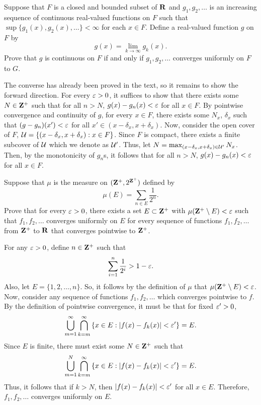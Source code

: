 \documentclass[11pt,oneside]{book}
\begin{document}
\begin{exercise}
    Suppose that $F$ is a closed and bounded subset of $\mathbf{R}$ and $g_1,g_2,\ldots$ is an increasing sequence of continuous real-valued functions on $F$ such that $\sup\{g_1(x), g_2(x),\ldots\} < \infty$ for each $x \in F$. Define a real-valued function $g$ on $F$ by \[
        g(x) = \lim_{k\to\infty} g_k(x).
    \]
    Prove that $g$ is continuous on $F$ if and only if $g_1,g_2,\ldots$ converges uniformly on $F$ to $G$.
\end{exercise}
\begin{solution}
    The converse has already been proved in the text, so it remains to
    show the forward direction. For every $\varepsilon > 0$, it suffices to show that
    there exists some $N \in \mathbf{Z}^+$ such that for all $n > N$, $g(x) - g_n(x) <
    \varepsilon$ for all $x \in F$. By pointwise convergence and continuity of $g$, 
    for every $x\in F$, there exists
    some $N_x$, $\delta_x$ such that $(g - g_n)(x') < \varepsilon$ for all $x' \in (x-\delta_x, x+\delta_x)$.
    Now, consider the open cover of $F$, $\mathcal{U} = \{(x-\delta_x, x+\delta_x): x\in F\}$. Since $F$ is 
    compact, there exists a finite subcover of $\mathcal{U}$ which we denote as $\mathcal{U}'$. 
    Thus, let $N = \max_{(x-\delta_x, x+\delta_x) \in \mathcal{U}'} N_x$. Then, by the monotonicity of $g_n$s,
    it follows that for all $n > N$, $g(x) - g_n(x) < \varepsilon$ for all $x \in F$. 
\end{solution}
\begin{exercise}
    Suppose that $\mu$ is the measure on $(\mathbf{Z}^+, 2^{\mathbf{Z}^+})$ defined by 
    \[
        \mu(E) = \sum_{n\in E}\frac{1}{2^n}.
    \]
    Prove that for every $\varepsilon > 0$, there exists a set $E\subset \mathbf{Z}^+$ with $\mu(\mathbf{Z}^+ \setminus E) < \varepsilon$ such that $f_1,f_2,\ldots$ converges uniformly on $E$ for every sequence of functions $f_1,f_2,\ldots$ from $\mathbf{Z}^+$ to $\mathbf{R}$ that converges pointwise to $\mathbf{Z}^+$.
\end{exercise}
\begin{solution}
    For any $\varepsilon > 0$, define $n\in\mathbf{Z}^+$ such that 
    \[
        \sum_{i=1}^n \frac{1}{2^i} > 1 - \varepsilon.     
    \]
    Also, let $E = \{1, 2, \ldots, n\}$. So, it follows by the definition of $\mu$ that $\mu(\mathbf{Z}^+\setminus E) < \varepsilon$. 
    Now, consider any sequence of functions $f_1, f_2,\ldots$ which converges pointwise to $f$. By the definition
    of pointwise convergence, it must be that for fixed $\varepsilon' > 0$, 
    \[
        \bigcup_{m=1}^\infty \bigcap_{k=m}^\infty \left\{x\in E: |f(x) - f_k(x)| < \varepsilon'\right\} = E.   
    \]
    Since $E$ is finite, there must exist some $N \in \mathbf{Z}^+$ such that 
    \[
        \bigcup_{m=1}^N \bigcap_{k=m}^\infty \left\{x\in E: |f(x) - f_k(x)| < \varepsilon'\right\} = E.
    \]
    Thus, it follows that if $k > N$, then $|f(x) - f_k(x)| < \varepsilon'$ for all $x\in E$. Therefore, 
    $f_1,f_2,\ldots$ converges uniformly on $E$. 
\end{solution}
\end{document}
